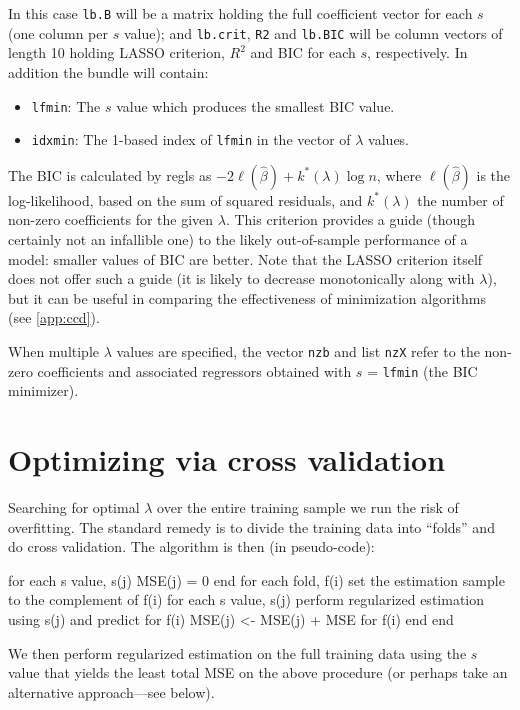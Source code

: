 \documentclass{article}
\begin{document}
In this case \texttt{lb.B} will be a matrix holding the full
coefficient vector for each $s$ (one column per $s$ value); and
\texttt{lb.crit}, \texttt{R2} and \texttt{lb.BIC} will be column
vectors of length 10 holding LASSO criterion, $R^2$ and BIC for each
$s$, respectively. In addition the bundle will contain:
\begin{itemize}
\item \texttt{lfmin}: The $s$ value which produces the smallest BIC
  value.
\item \texttt{idxmin}: The 1-based index of \texttt{lfmin} in the
  vector of $\lambda$ values.
\end{itemize}

The BIC \citep{schwarz78} is calculated by \textsf{regls} as
$-2\ell(\hat{\beta}) + k^*(\lambda) \log n$, where $\ell(\hat{\beta})$
is the log-likelihood, based on the sum of squared residuals, and
$k^*(\lambda)$ the number of non-zero coefficients for the given
$\lambda$. This criterion provides a guide (though certainly not an
infallible one) to the likely out-of-sample performance of a model:
smaller values of BIC are better. Note that the LASSO criterion itself
does not offer such a guide (it is likely to decrease monotonically
along with $\lambda$), but it can be useful in comparing the
effectiveness of minimization algorithms (see \ref{app:ccd}).

When multiple $\lambda$ values are specified, the vector \texttt{nzb}
and list \texttt{nzX} refer to the non-zero coefficients and
associated regressors obtained with $s$ = \texttt{lfmin} (the BIC
minimizer).

\section{Optimizing via cross validation}
\label{sec:xvalid}

Searching for optimal $\lambda$ over the entire training sample we run
the risk of overfitting. The standard remedy is to divide the training
data into ``folds'' and do cross validation. The algorithm is then (in
pseudo-code):
\begin{code}
for each s value, s(j)
  MSE(j) = 0
end
for each fold, f(i)
  set the estimation sample to the complement of f(i)
  for each s value, s(j)
    perform regularized estimation using s(j) and predict for f(i)
    MSE(j) <- MSE(j) + MSE for f(i)
  end
end
\end{code}
We then perform regularized estimation on the full training data using the
$s$ value that yields the least total MSE on the above procedure (or
perhaps take an alternative approach---see below).
\end{document}
